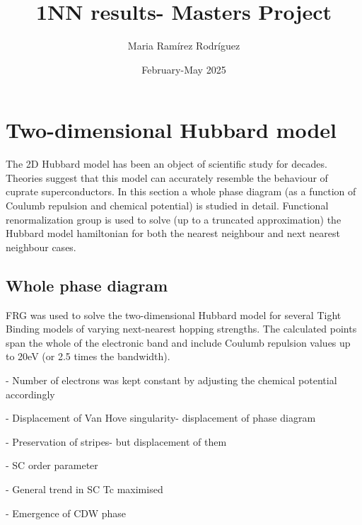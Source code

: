 \documentclass{article}
\title{1NN results- Masters Project}
\author{Maria Ramírez Rodríguez}
\date{February-May 2025}
\begin{document}
\maketitle



\section{Two-dimensional Hubbard model}

The 2D Hubbard model has been an object of scientific study for decades. Theories suggest that this model can accurately resemble the behaviour of cuprate superconductors. In this section a whole phase diagram (as a function of Coulumb repulsion and chemical potential) is studied in detail. 
Functional renormalization group is used to solve (up to a truncated approximation) the Hubbard model hamiltonian for both the nearest neighbour and next nearest neighbour cases.

\subsection{Whole phase diagram}

FRG was used to solve the two-dimensional Hubbard model for several Tight Binding models of varying next-nearest hopping strengths. The calculated points span the whole of the electronic band and include Coulumb repulsion values up to 20eV (or 2.5 times the bandwidth).

- Number of electrons was kept constant by adjusting the chemical potential accordingly

- Displacement of Van Hove singularity- displacement of phase diagram 

- Preservation of stripes- but displacement of them

- SC order parameter

- General trend in SC Tc maximised

- Emergence of CDW phase
\end{document}
